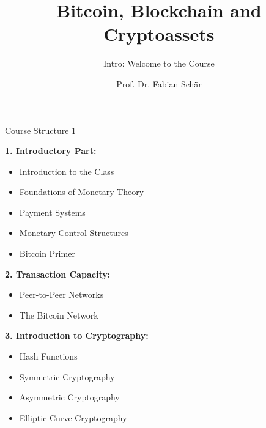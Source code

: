 \documentclass[handout]{beamer}
\title{Bitcoin, Blockchain and Cryptoassets}
\subtitle{Intro: Welcome to the Course}
\author{Prof. Dr. Fabian Schär}
\institute{University of Basel}
\begin{document}
\thispagestyle{empty}
\begin{frame}[noframenumbering]
	\titlepage
\end{frame}

\begin{frame}{Course Structure 1}
\footnotesize

\textbf{1. Introductory Part:}
	\begin{itemize}
		\item Introduction to the Class
		\item Foundations of Monetary Theory
		\item Payment Systems
		\item Monetary Control Structures
		\item Bitcoin Primer
	\end{itemize}
	
\vspace{0.5em}

\textbf{2. Transaction Capacity:}
	\begin{itemize}
		\item Peer-to-Peer Networks
		\item The Bitcoin Network
	\end{itemize}
	
\vspace{0.5em}	
	
	\textbf{3. Introduction to Cryptography:}
	\begin{itemize}
		\item Hash Functions
		\item Symmetric Cryptography
		\item Asymmetric Cryptography
		\item Elliptic Curve Cryptography
	\end{itemize}

	
\end{frame}
\end{document}
